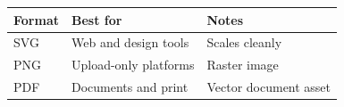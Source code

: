 \begin{tabular}{lll}
\toprule
Format & Best for & Notes\\
\midrule
SVG & Web and design tools & Scales cleanly\\
PNG & Upload-only platforms & Raster image\\
PDF & Documents and print & Vector document asset\\
\bottomrule
\end{tabular}
